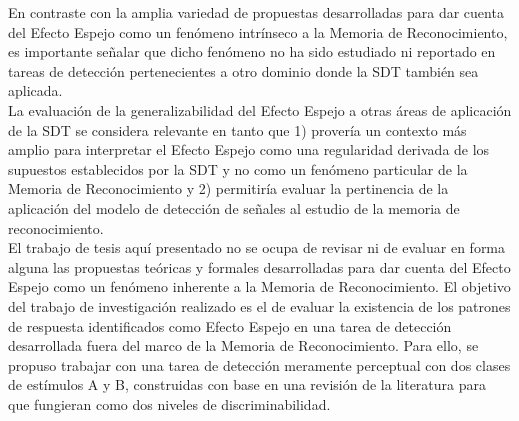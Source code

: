 En contraste con la amplia variedad de propuestas desarrolladas para dar cuenta del Efecto Espejo como un fenómeno intrínseco a la Memoria de Reconocimiento, es importante señalar que dicho fenómeno no ha sido estudiado ni reportado en tareas de detección pertenecientes a otro dominio donde la SDT también sea aplicada.\\

La evaluación de la generalizabilidad del Efecto Espejo a otras áreas de aplicación de la SDT se considera relevante en tanto que 1) provería un contexto más amplio para interpretar el Efecto Espejo como una regularidad derivada de los supuestos establecidos por la SDT y no como un fenómeno particular de la Memoria de Reconocimiento y 2) permitiría evaluar la pertinencia de la aplicación del modelo de detección de señales al estudio de la memoria de reconocimiento.\\

El trabajo de tesis aquí presentado no se ocupa de revisar ni de evaluar en forma alguna las propuestas teóricas y formales desarrolladas para dar cuenta del Efecto Espejo como un fenómeno inherente a la Memoria de Reconocimiento. El objetivo del trabajo de investigación realizado es el de evaluar la existencia de los patrones de respuesta identificados como Efecto Espejo en una tarea de detección desarrollada fuera del marco de la Memoria de Reconocimiento. Para ello, se propuso trabajar con una tarea de detección meramente perceptual con dos clases de estímulos A y B, construidas con base en una revisión de la literatura para que fungieran como dos niveles de discriminabilidad.\\

